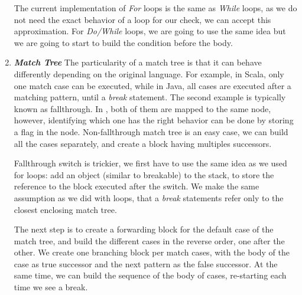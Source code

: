 \begin{enumerate}
	The current implementation of \emph{For} loops is the same as \emph{While} loops, as we do not need the exact behavior of a loop for our check, we can accept this approximation.
	For \emph{Do/While} loops, we are going to use the same idea but we are going to start to build the condition before the body.
	
	\item \textbf{\textit{Match Tree}} \newline 
	\label{subsubsec:match_tree_cfg}
	The particularity of a match tree is that it can behave differently depending on the original language.
	For example, in Scala, only one match case can be executed, while in Java, all cases are executed after a matching pattern, until a \emph{break} statement.
	The second example is typically known as fallthrough. 
	In \slang{}, both of them are mapped to the same node, however, identifying which one has the right behavior can be done by storing a flag in the node.
	Non-fallthrough match tree is an easy case, we can build all the cases separately, and create a block having multiples successors.
	
	Fallthrough switch is trickier, we first have to use the same idea as we used for loops: add an object (similar to breakable) to the stack, to store the reference to the block executed after the switch.
	We make the same assumption as we did with loops, that a \emph{break} statements refer only to the closest enclosing match tree. 
	
	The next step is to create a forwarding block for the default case of the match tree, and build the different cases in the reverse order, one after the other. 
	We create one branching block per match cases, with the body of the case as true successor and the next pattern as the false successor. 
	At the same time, we can build the sequence of the body of cases, re-starting each time we see a break.
	
	
	

\end{enumerate}
